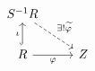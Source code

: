 \documentclass{article}
\begin{document}
    \begin{equation*}
        \begin{tikzcd}
            S^{-1}R \ar[dr, "\ex!\widetilde{\phi}", dashrightarrow] \\
            R \ar[u, "\iota", hookrightarrow] \ar[r, "\phi"'] & Z
        \end{tikzcd}
    \end{equation*}
\end{document}
